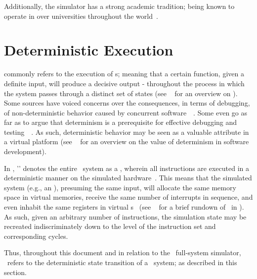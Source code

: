 Additionally, the simulator has a strong academic tradition; being known to operate in over  universities throughout the world~.

\section{Deterministic Execution}
\label{sec:simics_deterministicexecution}
 commonly refers to the execution of \dvttermdeterministicalgorithm s; meaning that a certain function, given a definite input, will produce a decisive output - throughout the process in which the system passes through a distinct set of states (see ~ for an overview on ).
Some sources have voiced concerns over the consequences, in terms of debugging, of non-deterministic behavior caused by concurrent software~~.
Some even go as far as to argue that determinism is a prerequisite for effective debugging and testing~~.
As such, deterministic behavior may be seen as a valuable attribute in a virtual platform (see ~ for an overview on the value of determinism in software development).

In \dvttermsimics , '\dvttermdeterministicexecution ' denotes the entire \dvttermtarget\ system as a \dvttermdeterministicalgorithm , wherein all instructions are executed in a deterministic manner on the simulated hardware~.
This means that the simulated system (e.g., an \dvttermos ), presuming the same input, will allocate the same memory space in virtual memories, receive the same number of interrupts in sequence, and even inhabit the same registers in virtual \dvttermcpu s~ (see ~ for a brief rundown of \dvttermdeterministicexecution\ in \dvttermsimics ).
As such, given an arbitrary number of instructions, the simulation state may be recreated indiscriminately down to the level of the instruction set and corresponding cycles.

Thus, throughout this document and in relation to the \dvttermsimics\ full-system simulator, \dvttermdeterministicexecution\ refers to the deterministic state transition of a \dvttermtarget\ system; as described in this section.

